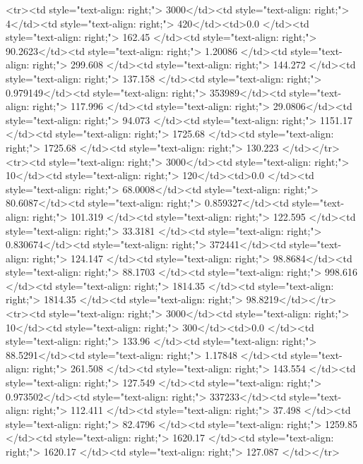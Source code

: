 <tr><td style="text-align: right;">      3000</td><td style="text-align: right;">         4</td><td style="text-align: right;">           420</td><td>0.0          </td><td style="text-align: right;">               162.45  </td><td style="text-align: right;">            90.2623</td><td style="text-align: right;">         1.20086 </td><td style="text-align: right;">        299.608 </td><td style="text-align: right;">           144.272 </td><td style="text-align: right;">             137.158   </td><td style="text-align: right;">             0.979149</td><td style="text-align: right;">              353989</td><td style="text-align: right;">                      117.996 </td><td style="text-align: right;">            29.0806</td><td style="text-align: right;">                94.073  </td><td style="text-align: right;">      1151.17  </td><td style="text-align: right;">   1725.68 </td><td style="text-align: right;">      1725.68 </td><td style="text-align: right;">                130.223 </td></tr>
<tr><td style="text-align: right;">      3000</td><td style="text-align: right;">        10</td><td style="text-align: right;">           120</td><td>0.0          </td><td style="text-align: right;">                68.0008</td><td style="text-align: right;">            80.6087</td><td style="text-align: right;">         0.859327</td><td style="text-align: right;">        101.319 </td><td style="text-align: right;">           122.595 </td><td style="text-align: right;">              33.3181  </td><td style="text-align: right;">             0.830674</td><td style="text-align: right;">              372441</td><td style="text-align: right;">                      124.147 </td><td style="text-align: right;">            98.8684</td><td style="text-align: right;">                88.1703 </td><td style="text-align: right;">       998.616 </td><td style="text-align: right;">   1814.35 </td><td style="text-align: right;">      1814.35 </td><td style="text-align: right;">                 98.8219</td></tr>
<tr><td style="text-align: right;">      3000</td><td style="text-align: right;">        10</td><td style="text-align: right;">           300</td><td>0.0          </td><td style="text-align: right;">               133.96  </td><td style="text-align: right;">            88.5291</td><td style="text-align: right;">         1.17848 </td><td style="text-align: right;">        261.508 </td><td style="text-align: right;">           143.554 </td><td style="text-align: right;">             127.549   </td><td style="text-align: right;">             0.973502</td><td style="text-align: right;">              337233</td><td style="text-align: right;">                      112.411 </td><td style="text-align: right;">            37.498 </td><td style="text-align: right;">                82.4796 </td><td style="text-align: right;">      1259.85  </td><td style="text-align: right;">   1620.17 </td><td style="text-align: right;">      1620.17 </td><td style="text-align: right;">                127.087 </td></tr>

